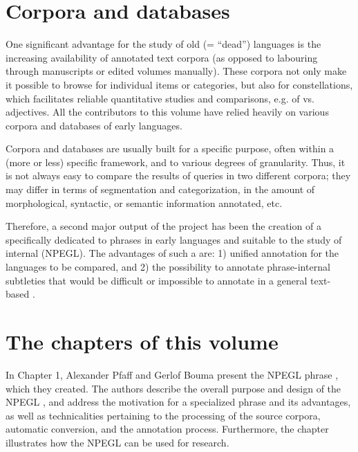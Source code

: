 \begin{refsection}
\section*{Corpora and databases }

One significant advantage for the study of old (= ``dead'') languages is the increasing availability of annotated text corpora (as opposed to labouring through manuscripts or edited volumes manually). These corpora not only make it possible to browse for individual items or categories, but also for constellations, which facilitates reliable quantitative studies and comparisons, e.g. of  vs.  adjectives. All the contributors to this volume have relied heavily on various corpora and databases of early  languages. 

Corpora and databases are usually built for a specific purpose, often within a (more or less) specific framework, and to various degrees of granularity. Thus, it is not always easy to compare the results of queries in two different corpora; they may differ in terms of segmentation and categorization, in the amount of morphological, syntactic, or semantic information annotated, etc.  

Therefore, a second major output of the project has been the creation of a  specifically dedicated to  phrases in early  languages and suitable to the study of  internal  (NPEGL). The advantages of such a  are: 1) unified annotation for the languages to be compared, and 2) the possibility to annotate  phrase-internal subtleties that would be difficult or impossible to annotate in a general text-based . 


\section*{The chapters of this volume }  

In Chapter 1, Alexander Pfaff and Gerlof Bouma present the NPEGL  phrase , which they created. The authors describe the overall purpose and design of the NPEGL , and address the motivation for a specialized  phrase  and its advantages, as well as technicalities pertaining to the processing of the source corpora, automatic conversion, and the annotation process. Furthermore, the chapter illustrates how the NPEGL  can be used for research.


\end{refsection}
